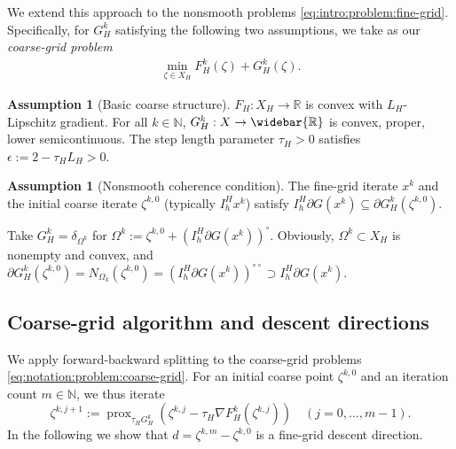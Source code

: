 \documentclass[a4paper,english]{jnsao}
\theoremstyle{definition}
\newtheorem{assumption}[theorem]{Assumption}
\numberwithin{algorithm}{section}
\DeclareMathOperator{\prox}{prox}
\newcommand{\df}[2]{#1 ( #2 )}
\def\grad{\nabla}
\def\term#1{\emph{#1}}
\def\defeq{:=}
\def\N{\mathbb{N}}
\def\R{\mathbb{R}}
\def\extR{\widebar{\R}}
\def\polar#1{#1^\circ}
\def\bipolar#1{#1^{\circ\circ}}
\begin{document}
We extend this approach to the nonsmooth problems \eqref{eq:intro:problem:fine-grid}.
Specifically, for $G_H^k$ satisfying the following two assumptions, we take as our \term{coarse-grid problem}
\begin{align}
    \label{eq:notation:problem:coarse-grid}
    \min_{\zeta \in X_{H}} F_H^k(\zeta) + G_H^k(\zeta).
\end{align}

\begin{assumption}[Basic coarse structure]
    \label{ass:coarse:basic}
    $F_H: X_H \to \R$ is convex with $L_H$-Lipschitz gradient. For all $k \in \N$, $G_H^k: X \to \extR$ is convex, proper, lower semicontinuous.
    The step length parameter $\tau_H>0$ satisfies $\epsilon \defeq 2- \tau_HL_H > 0$.
\end{assumption}

\begin{assumption}[Nonsmooth coherence condition]
    \label{ass:coarse:coherence}
    The fine-grid iterate $x^k$ and the initial coarse iterate $\zeta^{k,0}$
    (typically $I_h^H x^k$) satisfy
    $
        \df{I_{h}^{H}\partial G}{x^{k}}\subseteq \df{\partial G_{H}^{k}}{\zeta^{k,0}}.
    $
\end{assumption}

\begin{example}
    \label{ex:coarse:canonical:gH}
    Take $G_H^k=\delta_{\Omega^k}$ for $\Omega^k \defeq  \zeta^{k,0} + \polar{(I_h^H\partial G(x^k))}$.
    Obviously, $\Omega^k \subset X_H$ is nonempty and convex, and $\partial G_H^k(\zeta^{k,0})=N_{\Omega_k}(\zeta^{k,0})=\bipolar{(I_h^H\partial G(x^k))} \supset I_h^H\partial G(x^k)$.
\end{example}

\subsection{Coarse-grid algorithm and descent directions}

We apply forward-backward splitting to the coarse-grid problems \eqref{eq:notation:problem:coarse-grid}.
For an initial coarse point $\zeta^{k,0}$ and an iteration count $m \in \N$, we  thus iterate
\begin{equation}
    \label{eq:coarse:alg}
    \zeta^{k,j+1}
    \defeq
    \prox_{\tau_H G_H^k}(\zeta^{k,j} - \tau_H \grad F_H^k(\zeta^{k,j}))
    \quad
    (j=0,\ldots,m-1).
\end{equation}
In the following we show that $d=\zeta^{k,m}-\zeta^{k,0}$ is a fine-grid descent direction.
\end{document}
